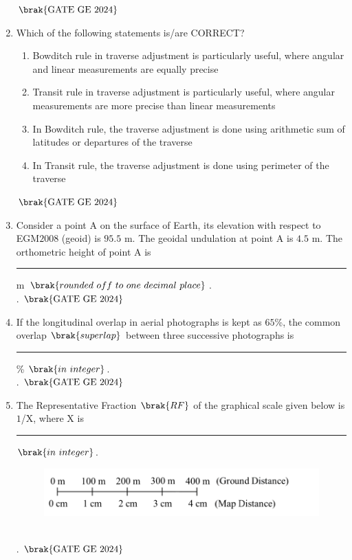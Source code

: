 \documentclass[journal,12pt,onecolumn]{IEEEtran}
\theoremstyle{remark}
\begin{document}
\begin{enumerate}
\begin{enumerate}
\end{enumerate}
\hfill $\brak{\text{GATE GE 2024}}$
\bigskip
\item Which of the following statements is/are CORRECT?
\begin{enumerate}
\item Bowditch rule in traverse adjustment is particularly useful, where angular and linear measurements are equally precise
\item Transit rule in traverse adjustment is particularly useful, where angular measurements are more precise than linear measurements
\item In Bowditch rule, the traverse adjustment is done using arithmetic sum of latitudes or departures of the traverse
\item In Transit rule, the traverse adjustment is done using perimeter of the traverse
\end{enumerate}
\hfill $\brak{\text{GATE GE 2024}}$
\bigskip
\item Consider a point A on the surface of Earth, its elevation with respect to EGM$2008$ (geoid) is $95.5$ m.
The geoidal undulation at point A is $4.5$ m. The orthometric height of point A is \rule{2cm}{0.5mm} m $\brak{rounded\ off\ to\ one\ decimal\ place}$.\\.
\hfill $\brak{\text{GATE GE 2024}}$
\bigskip
\item If the longitudinal overlap in aerial photographs is kept as $65$\%, the common overlap $\brak{superlap}$ between three successive photographs is \rule{2cm}{0.5mm} \% $\brak{in\ integer}$.\\.
\hfill $\brak{\text{GATE GE 2024}}$
\bigskip
\item The Representative Fraction $\brak{RF}$ of the graphical scale given below is $1$/X, where X is \rule{2cm}{0.5mm} $\brak{in\ integer}$.
\begin{figure}[H]
    \centering
    \includegraphics[width=0.7\columnwidth]{figs/fig8.png}
    \caption{}
    \label{figs:fig8}
\end{figure}\\.
\hfill $\brak{\text{GATE GE 2024}}$
\bigskip


\end{enumerate}
\end{document}
